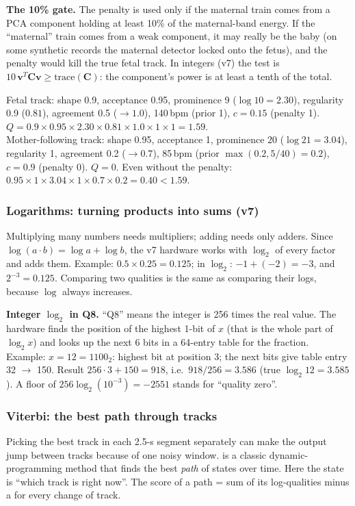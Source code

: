 \documentclass[11pt]{article}
\begin{document}
\textbf{The 10\% gate.} The penalty is used only if the maternal train comes from a PCA component holding at least 10\% of the maternal-band energy. If the ``maternal'' train comes from a weak component, it may really be the baby (on some synthetic records the maternal detector locked onto the fetus), and the penalty would kill the true fetal track. In integers (v7) the test is $10\,\mathbf{v}^T\mathbf{C}\mathbf{v} \ge \text{trace}(\mathbf{C})$: the component's power is at least a tenth of the total.

\begin{simple}
Fetal track: shape 0.9, acceptance 0.95, prominence 9 ($\log 10 = 2.30$), regularity 0.9 ($0.81$), agreement 0.5 ($\to 1.0$), 140\,bpm (prior 1), $c = 0.15$ (penalty 1).
$Q = 0.9 \times 0.95 \times 2.30 \times 0.81 \times 1.0 \times 1 \times 1 = 1.59$.\\
Mother-following track: shape 0.95, acceptance 1, prominence 20 ($\log 21 = 3.04$), regularity 1, agreement 0.2 ($\to 0.7$), 85\,bpm (prior $\max(0.2, 5/40) = 0.2$), $c = 0.9$ (penalty 0).
$Q = 0$. Even without the penalty: $0.95\times1\times3.04\times1\times0.7\times0.2 = 0.40 < 1.59$.
\end{simple}

\subsubsection{Logarithms: turning products into sums (v7)}
\label{sec:log}
Multiplying many numbers needs multipliers; adding needs only adders. Since $\log(a\cdot b) = \log a + \log b$, the v7 hardware works with $\log_2$ of every factor and adds them. Example: $0.5 \times 0.25 = 0.125$; in $\log_2$: $-1 + (-2) = -3$, and $2^{-3} = 0.125$. Comparing two qualities is the same as comparing their logs, because $\log$ always increases.

\textbf{Integer $\log_2$ in Q8.} ``Q8'' means the integer is 256 times the real value. The hardware finds the position of the highest 1-bit of $x$ (that is the whole part of $\log_2 x$) and looks up the next 6 bits in a 64-entry table for the fraction. Example: $x = 12 = 1100_2$: highest bit at position 3; the next bits give table entry 32 $\to$ 150. Result $256\cdot3 + 150 = 918$, i.e.\ $918/256 = 3.586$ (true $\log_2 12 = 3.585$). A floor of $256\log_2(10^{-3}) = -2551$ stands for ``quality zero''.

\subsubsection{Viterbi: the best path through tracks}
\label{sec:viterbi}
Picking the best track in each 2.5-s segment separately can make the output jump between tracks because of one noisy window.  is a classic dynamic-programming method that finds the best \emph{path} of states over time. Here the state is ``which track is right now''. The score of a path = sum of its log-qualities minus a  for every change of track.
\end{document}
